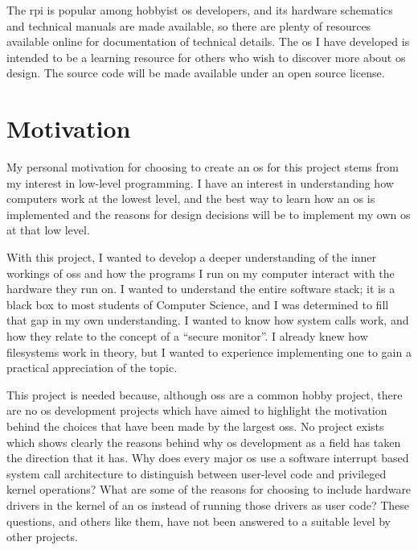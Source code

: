 \documentclass{article}
\begin{document}
The \gls{rpi} is popular among hobbyist \gls{os} developers, and its hardware
schematics and technical manuals are made available, so there are plenty of
resources available online for documentation of technical details. The \gls{os}
I have developed is intended to be a learning resource for others who wish to
discover more about \gls{os} design. The source code will be made available
under an open source license.

\section{Motivation}
My personal motivation for choosing to create an \gls{os} for this project
stems from my interest in low-level programming. I have an interest in
understanding how computers work at the lowest level, and the best way to learn
how an \gls{os} is implemented and the reasons for design decisions will be to
implement my own \gls{os} at that low level.

With this project, I wanted to develop a deeper understanding of the inner
workings of \glspl{os} and how the programs I run on my computer interact with
the hardware they run on. I wanted to understand the entire software stack; it
is a black box to most students of Computer Science, and I was determined to
fill that gap in my own understanding. I wanted to know how system calls work,
and how they relate to the concept of a ``secure monitor''. I already knew how
filesystems work in theory, but I wanted to experience implementing one to gain
a practical appreciation of the topic.

This project is needed because, although \glspl{os} are a common hobby project,
there are no \gls{os} development projects which have aimed to highlight the
motivation behind the choices that have been made by the largest \glspl{os}. No
project exists which shows clearly the reasons behind why \gls{os} development
as a field has taken the direction that it has. Why does every major \gls{os}
use a software interrupt based system call architecture to distinguish between
user-level code and privileged kernel operations? What are some of the reasons
for choosing to include hardware drivers in the kernel of an \gls{os} instead
of running those drivers as user code? These questions, and others like them,
have not been answered to a suitable level by other projects.
\end{document}
